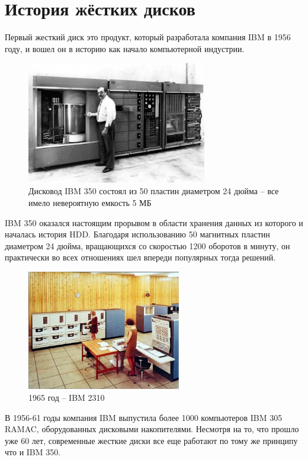 \documentclass[bachelor, och, referat]{SCWorks}
\begin{document}
\section{История жёстких дисков}

Первый жесткий диск это продукт, который разработала компания IBM в 1956 году, 
и вошел он в историю как начало компьютерной индустрии.

\begin{figure}[H]
    \centering
    \includegraphics[width=0.7\textwidth]{ibm350.png}
    \caption{Дисковод IBM 350 состоял из 50 пластин диаметром 24 дюйма -- все имело невероятную емкость 5 МБ}
    \label{}
\end{figure}

IBM 350 оказался настоящим прорывом в области хранения данных из которого и 
началась история HDD. Благодаря использованию 50 магнитных пластин диаметром 
24 дюйма, вращающихся со скоростью 1200 оборотов в минуту, он практически во 
всех отношениях шел впереди популярных тогда решений.

\begin{figure}[H]
    \centering
    \includegraphics[width=0.6\textwidth]{ibm2310.png}
    \caption{1965 год -- IBM 2310}
    \label{}
\end{figure}

В 1956-61 годы компания IBM выпустила более 1000 компьютеров IBM 305 RAMAC, 
оборудованных дисковыми накопителями. Несмотря на то, что прошло уже 60 лет, 
современные жесткие диски все еще работают по тому же принципу что и IBM 350.
\end{document}
